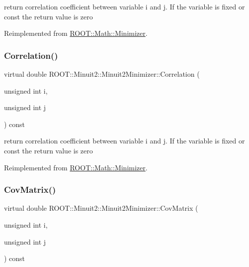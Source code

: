 return correlation coefficient between variable i and j. If the variable is fixed or const the return value is zero 

Reimplemented from \mbox{\hyperlink{classROOT_1_1Math_1_1Minimizer_a9ba2f4bc3c8c0e905f2c018e79809c0e}{R\+O\+O\+T\+::\+Math\+::\+Minimizer}}.

\mbox{\label{classROOT_1_1Minuit2_1_1Minuit2Minimizer_a229e82025189e72b5a03cb4e3be19f4a}} 
\subsubsection{\texorpdfstring{Correlation()}{Correlation()}\hspace{0.1cm}{\footnotesize\ttfamily [2/2]}}
{\footnotesize\ttfamily virtual double R\+O\+O\+T\+::\+Minuit2\+::\+Minuit2\+Minimizer\+::\+Correlation (\begin{DoxyParamCaption}\item[{unsigned int}]{i,  }\item[{unsigned int}]{j }\end{DoxyParamCaption}) const\hspace{0.3cm}{\ttfamily [virtual]}}

return correlation coefficient between variable i and j. If the variable is fixed or const the return value is zero 

Reimplemented from \mbox{\hyperlink{classROOT_1_1Math_1_1Minimizer_a9ba2f4bc3c8c0e905f2c018e79809c0e}{R\+O\+O\+T\+::\+Math\+::\+Minimizer}}.

\mbox{\label{classROOT_1_1Minuit2_1_1Minuit2Minimizer_a6ba10de01ab6e7228fa4908894de5619}} 
\subsubsection{\texorpdfstring{CovMatrix()}{CovMatrix()}\hspace{0.1cm}{\footnotesize\ttfamily [1/2]}}
{\footnotesize\ttfamily virtual double R\+O\+O\+T\+::\+Minuit2\+::\+Minuit2\+Minimizer\+::\+Cov\+Matrix (\begin{DoxyParamCaption}\item[{unsigned int}]{i,  }\item[{unsigned int}]{j }\end{DoxyParamCaption}) const\hspace{0.3cm}{\ttfamily [virtual]}}

